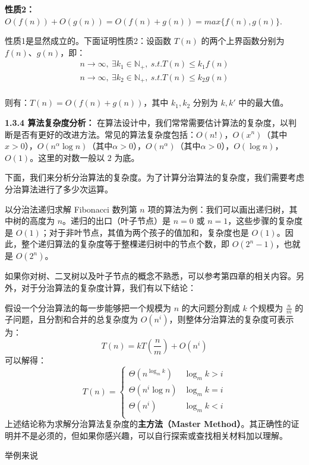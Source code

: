 \documentclass[a5paper]{ctexart}
\begin{document}
		\textbf{性质2：}$O(f(n))+O(g(n)) = O(f(n) + g(n)) = max\{f(n), g(n)\}$.
		
		性质1是显然成立的。下面证明性质2：设函数 $T(n)$ 的两个上界函数分别为 $f(n)、g(n)$，即：
		\begin{equation*}
			\begin{split}
				n\rightarrow \infty, \ \exists k_1 \in \mathbb{N_+},\ s.t. T(n) \le k_1f(n)\\
				n\rightarrow \infty, \ \exists k_2 \in \mathbb{N_+},\ s.t. T(n) \le k_2g(n)\\
			\end{split}
		\end{equation*}
		
		
		则有：$T(n) = O(f(n) + g(n))$，其中 $k_1, k_2$ 分别为 $k, k'$ 中的最大值。
		
		\vspace{12pt}
		
		\textbf{1.3.4 算法复杂度分析：} 在算法设计中，我们常常需要估计算法的复杂度，以判断是否有更好的改进方法。常见的算法复杂度包括：$O(n!)$，$O(x^n)$（其中$x > 0$），$O(n^\alpha \log n)$（其中$\alpha > 0$），$O(n^\alpha)$（其中$\alpha > 0$），$O(\log n)$，$O(1)$。这里的对数一般以 $2$ 为底。
		
		下面，我们来分析分治算法的复杂度。为了计算分治算法的复杂度，我们需要考虑分治算法进行了多少次运算。
		
		以分治法递归求解 Fibonacci 数列第 $n$ 项的算法为例：我们可以画出递归树，其中树的高度为 $n$。递归的出口（叶子节点）是 $n = 0$ 或 $n = 1$，这些步骤的复杂度是 $O(1)$；对于非叶节点，其值为两个孩子的值加和，复杂度也是 $O(1)$。因此，整个递归算法的复杂度等于整棵递归树中的节点个数，即 $O(2^{n} - 1)$，也就是 $O(2^n)$。
		
		如果你对树、二叉树以及叶子节点的概念不熟悉，可以参考第四章的相关内容。另外，对于分治算法的复杂度计算，我们有以下结论：
		
		假设一个分治算法的每一步能够把一个规模为 $n$ 的大问题分割成 $k$ 个规模为 $\frac{n}{m}$ 的子问题，且分割和合并的总复杂度为 $O(n^i)$，则整体分治算法的复杂度可表示为：
		$$
		T(n) = kT(\frac{n}{m}) + O(n^i) 
		$$
		可以解得：
		$$
		T(n) = 
		\begin{cases}
			\Theta(n^{\log _mk}) &\log_mk > i\\
			\Theta(n^{i}\log n) &\log_mk = i\\
			\Theta(n^{i}) &\log_mk < i\\
		\end{cases}
		$$
		上述结论称为求解分治算法复杂度的\textbf{主方法（Master Method）}。其正确性的证明并不是必须的，但如果你感兴趣，可以自行探索或查找相关材料加以理解。
		
		举例来说
		
\end{document}
